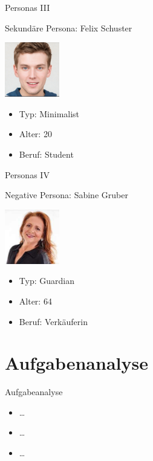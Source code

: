 \documentclass[presentation,bigger,aspectratio=169]{beamer}
\begin{document}
\begin{frame}[label={sec:org86a7a07}]{Personas III}
\begin{block}{Sekundäre Persona: Felix Schuster}
\begin{center}
\includegraphics[width=90px]{./img/m1_persona_3_rational.png}
\end{center}
\begin{itemize}
\item Typ: Minimalist
\item Alter: 20
\item Beruf: Student
\end{itemize}
\end{block}
\end{frame}
\begin{frame}[label={sec:orgb44edc2}]{Personas IV}
\begin{block}{Negative Persona: Sabine Gruber}
\begin{center}
\includegraphics[width=90px]{./img/m1_persona_4_guardian.jpg}
\end{center}
\begin{itemize}
\item Typ: Guardian
\item Alter: 64
\item Beruf: Verkäuferin
\end{itemize}
\end{block}
\end{frame}
\section{Aufgabenanalyse}
\label{sec:orgdd4a9ed}
\begin{frame}[label={sec:orgcfaa784}]{\vspace{2.2cm}\begin{center}\MakeUppercase{\insertsection}\end{center}}
\end{frame}
\begin{frame}[label={sec:orgb687b12}]{Aufgabeanalyse}
\begin{itemize}
\item \ldots{}
\item \ldots{}
\item \ldots{}
\end{itemize}
\end{frame}
\end{document}
